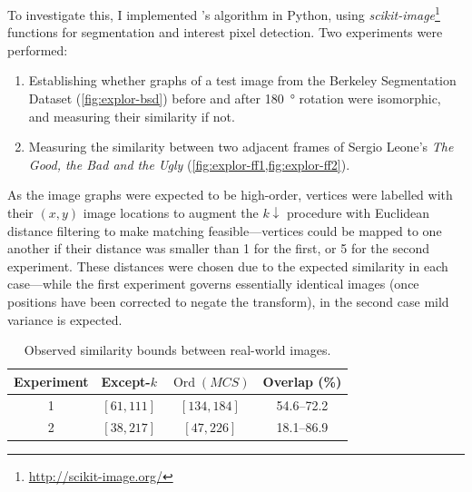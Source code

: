 \documentclass{mpaper}
\begin{document}
To investigate this, I implemented \citeauthor{Plane-Graphs-From-Images}'s algorithm in Python, using \textit{scikit-image}\footnote{\url{http://scikit-image.org/}} functions for segmentation and interest pixel detection.
Two experiments were performed:
\begin{enumerate}
	\item Establishing whether graphs of a test image from the Berkeley Segmentation Dataset \cite{BerkeleyDatabase} (\cref{fig:explor-bsd}) before and after \SI{180}{\degree} rotation were isomorphic, and measuring their similarity if not.
	\item Measuring the similarity between two adjacent frames of Sergio Leone's \emph{The Good, the Bad and the Ugly} (\cref{fig:explor-ff1,fig:explor-ff2}).
\end{enumerate}
As the image graphs were expected to be high-order, vertices were labelled with their $(x,y)$ image locations to augment the $k\downarrow$ procedure with Euclidean distance filtering to make matching feasible---vertices could be mapped to one another if their distance was smaller than 1 for the first, or 5 for the second experiment.
These distances were chosen due to the expected similarity in each case---while the first experiment governs essentially identical images (once positions have been corrected to negate the transform), in the second case mild variance is expected.

\begin{table}[h]
	\centering
	\begin{tabular}{cccc}
		\toprule
		Experiment & Except-$k$ & $\operatorname{Ord}(\mathit{MCS})$ & Overlap (\si{\percent}) \\ \midrule
		1 & $[61, 111]$ & $[134, 184]$ & 54.6--72.2 \\
		2 & $[38, 217]$ & $[47, 226]$ & 18.1--86.9 \\
		\bottomrule
	\end{tabular}
	
	\vspace{0.5em}
	\caption{
		Observed similarity bounds between real-world images.
		\label{tab:badgraphs}
	}
\end{table}
\end{document}
